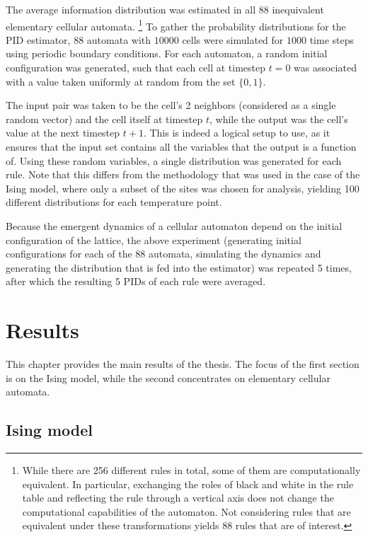 \documentclass[12pt]{article}
\begin{document}
The average information distribution was estimated in all 88 inequivalent elementary cellular automata. \footnote{While there are 256 different rules in total, some of them are computationally equivalent. In particular, exchanging the roles of black and white in the rule table and reflecting the rule through a vertical axis does not change the computational capabilities of the automaton. Not considering rules that are equivalent under these transformations yields 88 rules that are of interest.} To gather the probability distributions for the PID estimator, 88 automata with $10 000$ cells were simulated for $1000$ time steps using periodic boundary conditions. For each automaton, a random initial configuration was generated, such that each cell at timestep $t=0$ was associated with a value taken uniformly at random from the set $\{0,1\}$.

The input pair was taken to be the cell's 2 neighbors (considered as a single random vector) and the cell itself at timestep $t$, while the output was the cell's value at the next timestep $t+1$. This is indeed a logical setup to use, as it ensures that the input set contains all the variables that the output is a function of. Using these random variables, a single distribution was generated for each rule. Note that this differs from the methodology that was used in the case of the Ising model, where only a subset of the sites was chosen for analysis, yielding 100 different distributions for each temperature point. 

Because the emergent dynamics of a cellular automaton depend on the initial configuration of the lattice, the above experiment (generating initial configurations for each of the 88 automata, simulating the dynamics and generating the distribution that is fed into the estimator) was repeated 5 times, after which the resulting 5 PIDs of each rule were averaged.  

\newpage
\section{Results}

This chapter provides the main results of the thesis. The focus of the first section is on the Ising model, while the second concentrates on elementary cellular automata. 

\subsection{Ising model}
\end{document}
